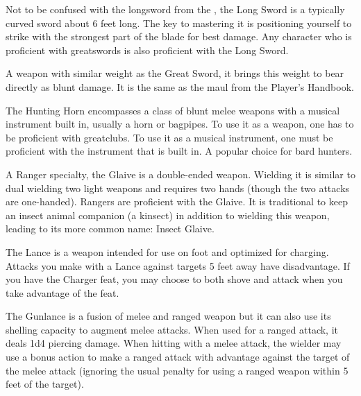 Not to be confused with the longsword from the \PHB, the Long Sword is a typically curved sword about 6 feet long. The key to mastering it is positioning yourself to strike with the strongest part of the blade for best damage. Any character who is proficient with greatswords is also proficient with the Long Sword.

A weapon with similar weight as the Great Sword, it brings this weight to bear directly as blunt damage. It is the same as the maul from the Player's Handbook.

The Hunting Horn encompasses a class of blunt melee weapons with a musical instrument built in, usually a horn or bagpipes. To use it as a weapon, one has to be proficient with greatclubs. To use it as a musical instrument, one must be proficient with the instrument that is built in. A popular choice for bard hunters.

A Ranger specialty, the Glaive is a double-ended weapon. Wielding it is similar to dual wielding two light weapons and requires two hands (though the two attacks are one-handed). Rangers are proficient with the Glaive. It is traditional to keep an insect animal companion (a kinsect) in addition to wielding this weapon, leading to its more common name: Insect Glaive.

The Lance is a weapon intended for use on foot and optimized for charging. Attacks you make with a Lance against targets 5 feet away have disadvantage. If you have the Charger feat, you may choose to both shove and attack when you take advantage of the feat.

The Gunlance is a fusion of melee and ranged weapon but it can also use its shelling capacity to augment melee attacks. When used for a ranged attack, it deals 1d4 piercing damage. When hitting with a melee attack, the wielder may use a bonus action to make a ranged attack with advantage against the target of the melee attack (ignoring the usual penalty for using a ranged weapon within 5 feet of the target).

